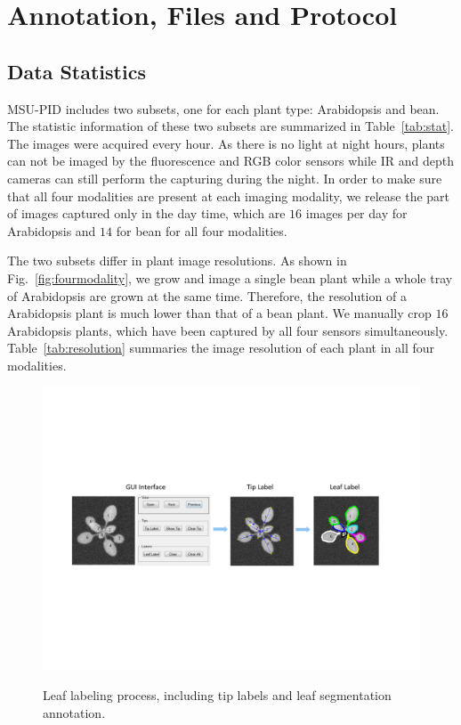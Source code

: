 \section{Annotation, Files and Protocol}
\subsection{Data Statistics}
MSU-PID includes two subsets, one for each plant type: Arabidopsis and bean.
The statistic information of these two subsets are summarized in Table~\ref{tab:stat}.
The images were acquired every hour.
As there is no light at night hours, plants can not be imaged by the fluorescence and RGB color sensors while IR and depth cameras can still perform the capturing during the night.
In order to make sure that all four modalities are present at each imaging modality, we release the part of images captured only in the day time, which are $16$ images per day for Arabidopsis and $14$ for bean for all four modalities.



The two subsets differ in plant image resolutions.
As shown in Fig.~\ref{fig:fourmodality}, we grow and image a single bean plant while a whole tray of Arabidopsis are grown at the same time.
Therefore, the resolution of a Arabidopsis plant is much lower than that of a bean plant.
We manually crop $16$ Arabidopsis plants, which have been captured by all four sensors simultaneously.
Table~\ref{tab:resolution} summaries the image resolution of each plant in all four modalities.


\begin{figure}
\centering
\includegraphics[width=.90\textwidth]{Figures/labeling}\\
\caption{Leaf labeling process, including tip labels and leaf segmentation annotation.}
\label{fig:label}
\end{figure}

